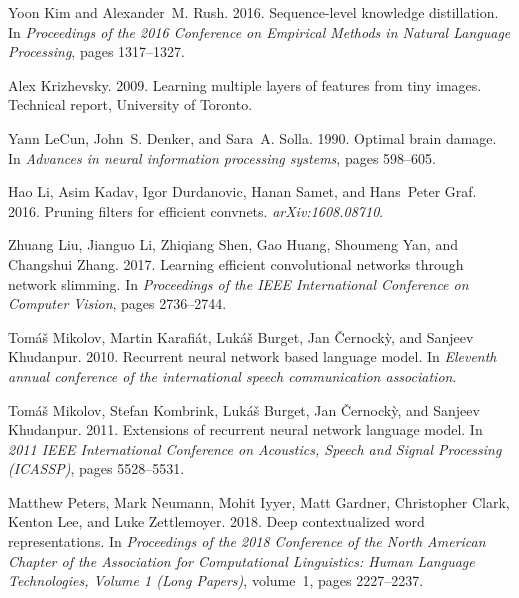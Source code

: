 \documentclass[11pt,a4paper]{article}
\begin{document}
\begin{thebibliography}{40}
Yoon Kim and Alexander~M. Rush. 2016.
\newblock Sequence-level knowledge distillation.
\newblock In \emph{Proceedings of the 2016 Conference on Empirical Methods in
  Natural Language Processing}, pages 1317--1327.

Alex Krizhevsky. 2009.
\newblock Learning multiple layers of features from tiny images.
\newblock Technical report, University of Toronto.

Yann LeCun, John~S. Denker, and Sara~A. Solla. 1990.
\newblock Optimal brain damage.
\newblock In \emph{Advances in neural information processing systems}, pages
  598--605.

Hao Li, Asim Kadav, Igor Durdanovic, Hanan Samet, and Hans~Peter Graf. 2016.
\newblock Pruning filters for efficient convnets.
\newblock \emph{arXiv:1608.08710}.

Zhuang Liu, Jianguo Li, Zhiqiang Shen, Gao Huang, Shoumeng Yan, and Changshui
  Zhang. 2017.
\newblock Learning efficient convolutional networks through network slimming.
\newblock In \emph{Proceedings of the IEEE International Conference on Computer
  Vision}, pages 2736--2744.

Tom{\'a}{\v{s}} Mikolov, Martin Karafi{\'a}t, Luk{\'a}{\v{s}} Burget, Jan
  {\v{C}}ernock{\`y}, and Sanjeev Khudanpur. 2010.
\newblock Recurrent neural network based language model.
\newblock In \emph{Eleventh annual conference of the international speech
  communication association}.

Tom{\'a}{\v{s}} Mikolov, Stefan Kombrink, Luk{\'a}{\v{s}} Burget, Jan
  {\v{C}}ernock{\`y}, and Sanjeev Khudanpur. 2011.
\newblock Extensions of recurrent neural network language model.
\newblock In \emph{2011 IEEE International Conference on Acoustics, Speech and
  Signal Processing (ICASSP)}, pages 5528--5531.

Matthew Peters, Mark Neumann, Mohit Iyyer, Matt Gardner, Christopher Clark,
  Kenton Lee, and Luke Zettlemoyer. 2018.
\newblock Deep contextualized word representations.
\newblock In \emph{Proceedings of the 2018 Conference of the North American
  Chapter of the Association for Computational Linguistics: Human Language
  Technologies, Volume 1 (Long Papers)}, volume~1, pages 2227--2237.


\end{thebibliography}
\end{document}
